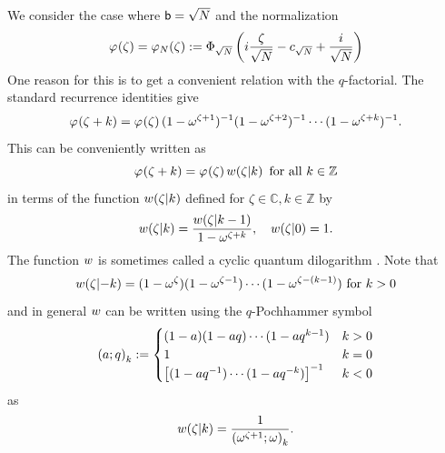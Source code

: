 \documentclass{sl2ams}
\numberwithin{equation}{section}
\newcommand{\CC}{\mathbb{C}}
\newcommand{\ZZ}{\mathbb{Z}}
\begin{document}
We consider the case where \(\mathsf b = \sqrt {N}\) and the normalization
\begin{equation}
  \pf{\zeta}
  =
  \pf[\nr]{\zeta}
  \defeq
  \Phi_{\sqrt \nr}\left(i \frac{\zeta}{\sqrt \nr} - c_{\sqrt N} + \frac{i}{\sqrt \nr} \right)
\end{equation}
One reason for this is to get a convenient relation with the \(q\)-factorial.
The standard recurrence identities \cite[Section 6]{Faddeev2001} give
\begin{equation}
  \label{eq:pf-recurrence}
  \pf{\zeta + k} = \pf{\zeta} (1 - \omega^{\zeta + 1})^{-1} (1 - \omega^{\zeta + 2})^{-1} \cdots (1 - \omega^{\zeta + k})^{-1}
  .
\end{equation}
This can be conveniently written as
\begin{equation*}
  \pf{\zeta + k} = \pf{\zeta} \qlog{\zeta}{k} \text{ for all } k \in \ZZ
\end{equation*}
in terms of the function%
\(w\mathopen{}\left(\zeta \middle | k \right)\) defined for \(\zeta \in \CC, k \in \ZZ\) by
\begin{equation}
  \label{eq:qlog-def}
  w\mathopen{}\left(\zeta \middle | k \right) = \frac{w\mathopen{}\left(\zeta \middle | k-1 \right)}{1 - \omega^{\zeta + k}}, \quad w\mathopen{}\left(\zeta \middle | 0 \right) = 1.
\end{equation}
The function \(w\) is sometimes called a cyclic quantum dilogarithm \cite[Section 3]{Faddeev1994}.
Note that 
\[
  w\mathopen{}\left(\zeta \middle | -k \right) = (1 - \omega^{\zeta}) (1 - \omega^{\zeta -1}) \cdots (1 - \omega^{\zeta - (k-1)})
  \text{ for } k > 0
\]
and in general \(w\) can be written using the \(q\)-Pochhammer symbol
\begin{equation}
  \label{eq:qp-def}
  \qp{a}[q]{k}
  \defeq
  \begin{cases}
    (1 - a)(1-aq) \cdots (1 - a q^{k-1})
    &
    k > 0
    \\
    1
    &
    k = 0
    \\
    \left[
      (1-aq^{-1}) \cdots (1 - a q^{-k})
    \right]^{-1}
    &
    k < 0
  \end{cases}
\end{equation}
as 
\begin{equation}
  \qlog{\zeta}{k}
  =
  \frac{1}{\qp{\omega^{\zeta+1}}{k}}.
\end{equation}
\end{document}
